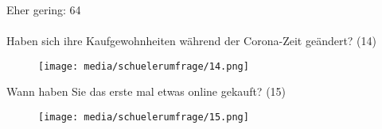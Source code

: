 Eher gering: 64\\\\
\fi
\newpage\noindent Haben sich ihre Kaufgewohnheiten während der Corona-Zeit geändert? (14)\vfill

\begin{figure}[H]
    \begin{center}
        \texttt{[image: media/schuelerumfrage/14.png]}
    \end{center}
\end{figure}
\iffalse
Nein: 92

Ja, mehr stationär: 0

Ja, mehr online: 55\\\\\\
\fi
\vfill\vfill
\noindent Wann haben Sie das erste mal etwas online gekauft? (15)\vfill

\begin{figure}[H]
    \begin{center}
        \texttt{[image: media/schuelerumfrage/15.png]}
    \end{center}
\end{figure} 
\vfill
\iffalse
Noch nie: 6

Vor 5 oder mehr Jahren: 64

Vor 1-5 Jahren: 57

Vor 1 Jahr oder später: 16
\fi












